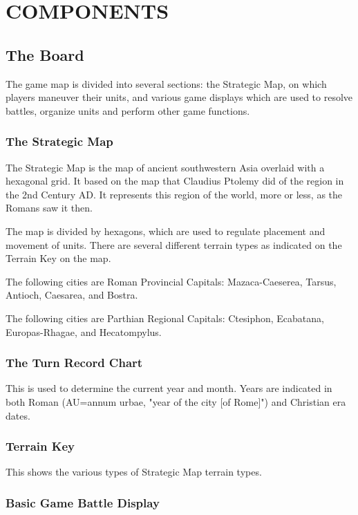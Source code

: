 \section{COMPONENTS}

\subsection{The Board}

The game map is divided into several sections: the Strategic Map, on which players maneuver their units, and various game displays which are used to resolve battles, organize units and perform other game functions.

\subsubsection{The Strategic Map}

The Strategic Map is the map of ancient southwestern Asia overlaid with a hexagonal grid. It based on the map that Claudius Ptolemy did of the region in the 2nd Century AD. It represents this region of the world, more or less, as the Romans saw it then.

The map is divided by hexagons, which are used to regulate placement and movement of units. There are several different terrain types as indicated on the Terrain Key on the map.

The following cities are Roman Provincial Capitals: Mazaca-Caeserea, Tarsus, Antioch, Caesarea, and Bostra.

The following cities are Parthian Regional Capitals: Ctesiphon, Ecabatana, Europas-Rhagae, and Hecatompylus.

\subsubsection{The Turn Record Chart}

This is used to determine the current year and month. Years are indicated in both Roman (AU=annum urbae, "year of the city [of Rome]") and Christian era dates.

\subsubsection{Terrain Key}

This shows the various types of Strategic Map terrain types.

\subsubsection{Basic Game Battle Display}

